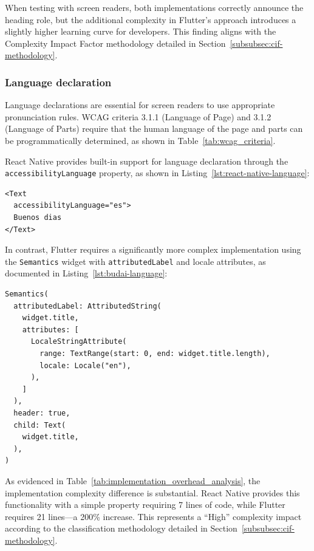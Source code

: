 When testing with screen readers, both implementations correctly announce the heading role, but the additional complexity in Flutter's approach introduces a slightly higher learning curve for developers. This finding aligns with the Complexity Impact Factor methodology detailed in Section~\ref{subsubsec:cif-methodology}.

\subsubsection{Language declaration}
\label{subsubsec:language-declaration}

Language declarations are essential for screen readers to use appropriate pronunciation rules. WCAG criteria 3.1.1 (Language of Page) and 3.1.2 (Language of Parts) require that the human language of the page and parts can be programmatically determined, as shown in Table~\ref{tab:wcag_criteria}.

React Native provides built-in support for language declaration through the \texttt{accessibilityLanguage} property, as shown in Listing~\ref{lst:react-native-language}:

\begin{lstlisting}[style=ReactNativeStyle, caption=Language declaration in React Native, label=lst:react-native-language]
<Text
  accessibilityLanguage="es">
  Buenos dias
</Text>
\end{lstlisting}

In contrast, Flutter requires a significantly more complex implementation using the \texttt{Semantics} widget with \texttt{attributedLabel} and locale attributes, as documented in Listing~\ref{lst:budai-language}:

\begin{lstlisting}[style=DartStyle, caption=Language implementation in Budai's code, label=lst:budai-language]
Semantics(
  attributedLabel: AttributedString(
    widget.title,
    attributes: [
      LocaleStringAttribute(
        range: TextRange(start: 0, end: widget.title.length),
        locale: Locale("en"),
      ),
    ]
  ),
  header: true,
  child: Text(
    widget.title,
  ),
)
\end{lstlisting}

As evidenced in Table~\ref{tab:implementation_overhead_analysis}, the implementation complexity difference is substantial. React Native provides this functionality with a simple property requiring 7 lines of code, while Flutter requires 21 lines—a 200\% increase. This represents a ``High'' complexity impact according to the classification methodology detailed in Section~\ref{subsubsec:cif-methodology}.

